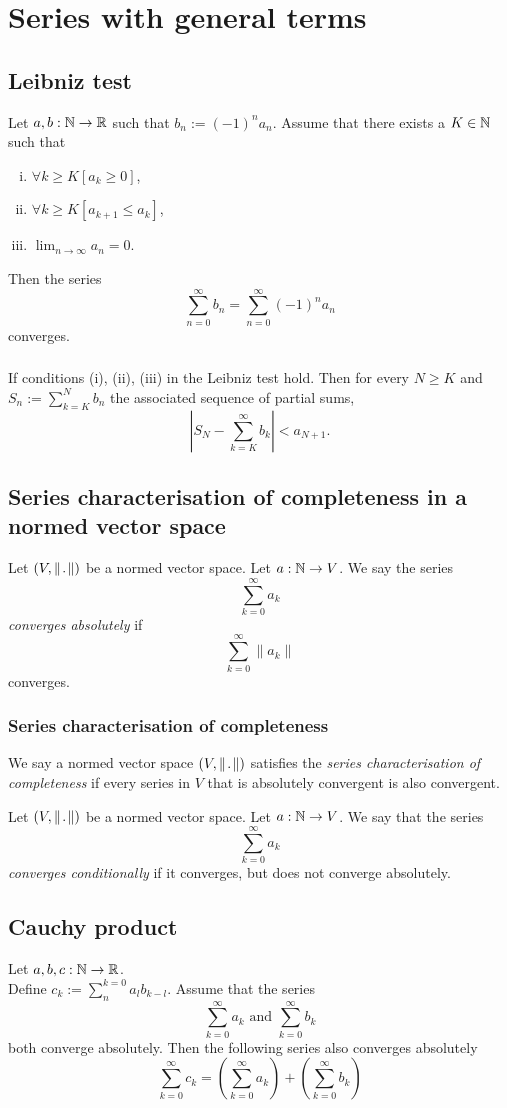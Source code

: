 \section{Series with general terms}


\subsection{Leibniz test}
\uthm Let $a,b : \mathbb{N} \to \mathbb{R}$ such that $b_n := (-1)^n a_n$.
Assume that there exists a $K \in \mathbb{N}$ such that
\begin{enumerate}[(i)]
    \item $\forall k \geq K \left[ a_k \geq 0 \right]$,
    \item $\forall k \geq K \left[ a_{k+1} \leq a_k \right]$,
    \item $\lim_{n \to \infty} a_n = 0$.
\end{enumerate}
Then the series 
\[
    \sum_{n=0}^{\infty} b_n = \sum_{n=0}^{\infty} (-1)^n a_n
\]
converges.

\subsubsection*{}
\uprop If conditions (i), (ii), (iii) in the Leibniz test hold.
Then for every $N \geq K$ and $S_n := \sum_{k=K}^{N} b_n$ the associated
sequence of partial sums,
\[
    \left| S_N - \sum_{k=K}^{\infty} b_k \right| < a_{N + 1}.
\]


\subsection{Series characterisation of completeness in a normed vector space}
\udef Let $(V, \norm)$ be a normed vector space. Let $a : \mathbb{N} \to V$.
We say the series
\[
    \sum_{k=0}^{\infty} a_k
\]
\emph{converges absolutely} if
\[
    \sum_{k=0}^{\infty} \| a_k \|
\]
converges.

\subsubsection*{Series characterisation of completeness}
\udef We say a normed vector space $(V, \norm)$ satisfies the
\emph{series characterisation of completeness} if every series in $V$
that is absolutely convergent is also convergent.

\udef Let $(V, \norm)$ be a normed vector space. Let $a : \mathbb{N} \to V$.
We say that the series
\[
    \sum_{k=0}^{\infty} a_k
\]
\emph{converges conditionally} if it converges, but does not converge absolutely.


\subsection{Cauchy product}
Let $a, b, c : \mathbb{N} \to \mathbb{R}$.\\
Define $c_k := \sum_{n}^{k=0} a_l b_{k-l}$.
Assume that the series
\[
    \sum_{k=0}^{\infty} a_k \text{ and }
    \sum_{k=0}^{\infty} b_k
\]
both converge absolutely. Then the following series also converges absolutely
\[
    \sum_{k=0}^{\infty} c_k = \left( \sum_{k=0}^{\infty} a_k \right)
        + \left( \sum_{k=0}^{\infty} b_k \right)
\]